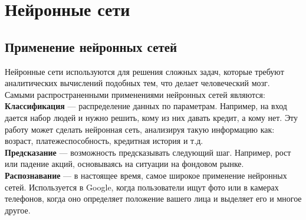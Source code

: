 \newpage

\chapter{Нейронные сети}
\section{Применение нейронных сетей}

Нейронные сети используются для решения сложных задач, которые требуют аналитических вычислений подобных тем, что делает человеческий мозг. Самыми распространенными применениями нейронных сетей являются: \\

 \textbf{Классификация} — распределение данных по параметрам. Например, на вход дается набор людей и нужно решить, кому из них давать кредит, а кому нет. Эту работу может сделать нейронная сеть, анализируя такую информацию как: возраст, платежеспособность, кредитная история и т.д. \\

 \textbf{Предсказание} — возможность предсказывать следующий шаг. Например, рост или падение акций, основываясь на ситуации на фондовом рынке. \\

 \textbf{Распознавание} — в настоящее время, самое широкое применение нейронных сетей. Используется в Google, когда пользователи ищут фото или в камерах телефонов, когда оно определяет положение вашего лица и выделяет его и многое другое.

